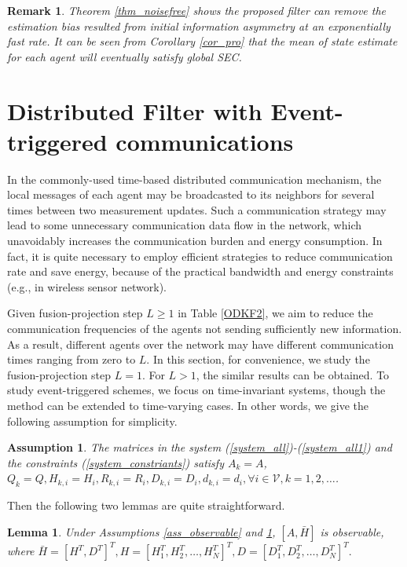 \documentclass[journal,transmag]{IEEEtran}
\newtheorem{remark}{\textbf{Remark}}
\newtheorem{lemma}{\textbf{Lemma}}
\newtheorem{assumption}{\textbf{Assumption}}
\begin{document}
{\begin{remark}
Theorem \ref{thm_noisefree}  shows the proposed filter can remove the  estimation bias resulted from initial information asymmetry at an exponentially fast rate. 
	It can be seen from Corollary \ref{cor_pro} that the mean of state estimate for each agent will eventually satisfy global  SEC.
\end{remark}



	
	
	\section{Distributed Filter with Event-triggered communications}
	In the commonly-used time-based distributed communication mechanism, the local messages of each agent may be broadcasted to its neighbors for several times between two measurement updates.
	Such a communication strategy may lead to some unnecessary communication data flow in the network, which unavoidably increases the communication  burden and energy consumption.
	In fact, it is quite necessary to employ efficient strategies to reduce communication rate and save energy, because of the practical bandwidth and energy constraints (e.g., in wireless sensor network).


	Given fusion-projection step $L\geq 1$ in Table \ref{ODKF2}, we aim to reduce the communication frequencies of the agents not sending sufficiently new information. As a result, different agents over the network may have different communication times  ranging from zero to $L$.
	In this section, for convenience, we study the fusion-projection step $L=1$. For $L>1$, the similar results can be obtained.
	To study event-triggered schemes, we focus on time-invariant systems, though the method can be extended to time-varying cases.  
	In other words, we give the following assumption for simplicity.
	
	\begin{assumption}\label{ass_A2}
		The matrices in the system (\ref{system_all})-(\ref{system_all1}) and the constraints (\ref{system_constriants}) satisfy $A_{k}=A$,  $Q_{k}=Q,H_{k,i}=H_{i},R_{k,i}=R_{i},D_{k,i}=D_{i},d_{k,i}=d_i,\forall i\in \mathcal{V}, k=1,2,\ldots$.
	\end{assumption}
	
	Then the following two lemmas are quite straightforward.
	
	\begin{lemma}
		Under Assumptions \ref{ass_observable} and \ref{ass_A2}, $[A,\bar H]$ is observable, where
		$\bar H=[H^T,D^T]^T, H= [H_{1}^T,H_{2}^T,\ldots,H_{N}^T]^T, D=[D_{1}^T,D_{2}^T,\ldots,D_{N}^T]^T.$
	\end{lemma}
	
}
\end{document}
